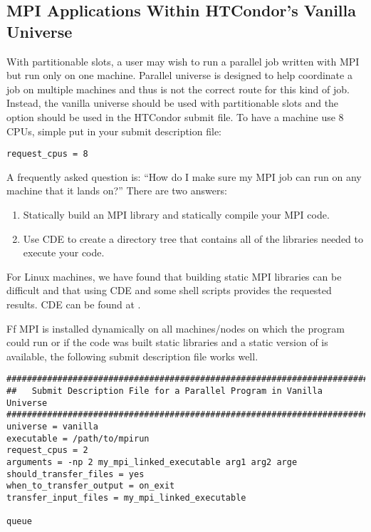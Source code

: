 \subsection{\label{sec:parallel-mpi-submit-single}MPI Applications Within HTCondor's Vanilla Universe}

With partitionable slots, a user may wish to run a parallel job written with
MPI but run only on one machine. Parallel universe is designed to help 
coordinate a job on multiple machines and thus is not the correct route for
this kind of job. Instead, the vanilla universe should be used with partitionable
slots and the  option should be used in the HTCondor submit
file. To have a machine use 8 CPUs, simple put in your submit description file:

\begin{verbatim}
request_cpus = 8
\end{verbatim}

A frequently asked question is: ``How do I make sure my MPI job can run 
on any machine that it lands on?'' There are two answers:
\begin{enumerate}
\item Statically build an MPI library and statically compile your MPI code.
\item Use CDE to create a directory tree that contains all of the libraries 
needed to execute your code.
\end{enumerate}

For Linux machines, we have found that building static MPI libraries can be 
difficult and that 
using CDE and some shell scripts provides the requested results. CDE can be
found at .

Ff MPI is installed dynamically on all machines/nodes on which the program 
could run or if the code was built static libraries and a static version of 
 is available, the following
submit description file works well.
\begin{verbatim}
################################################################################
##   Submit Description File for a Parallel Program in Vanilla Universe
################################################################################
universe = vanilla
executable = /path/to/mpirun
request_cpus = 2
arguments = -np 2 my_mpi_linked_executable arg1 arg2 arge
should_transfer_files = yes
when_to_transfer_output = on_exit
transfer_input_files = my_mpi_linked_executable

queue
\end{verbatim}

